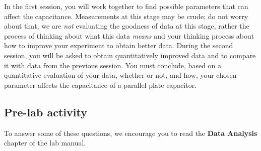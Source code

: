 \documentclass[12pt]{report}
\begin{document}
In the first session, you will work together to find possible parameters that can affect the capacitance. Measurements at this stage may be crude; do not worry about that, we are {\it not} evaluating the goodness of data at this stage, rather the process of thinking about what this data {\it means} and your thinking process about how to improve your experiment to obtain better data. During the second session, you will be asked to obtain quantitatively improved data and to compare it with data from the previous session. You must conclude, based on a quantitative evaluation of your data, whether or not, and how, your chosen parameter affects the capacitance of a parallel plate capacitor.


\subsection{Pre-lab activity}
To answer some of these questions, we encourage you to read the \textbf{Data Analysis} chapter of the lab manual.
\end{document}
